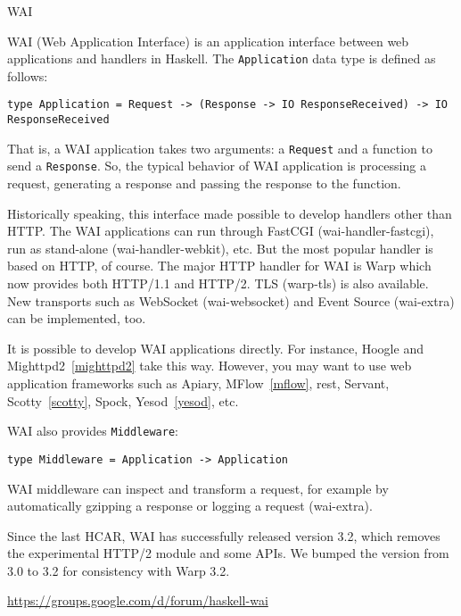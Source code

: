 \begin{hcarentry}{WAI}
\label{wai}
\makeheader

WAI (Web Application Interface) is an application interface
between web applications and handlers in Haskell.
The \texttt{Application} data type is defined as follows:

\begin{verbatim}
type Application = Request -> (Response -> IO ResponseReceived) -> IO ResponseReceived
\end{verbatim}

That is, a WAI application takes two arguments: a \texttt{Request} and
a function to send a \texttt{Response}.
So, the typical behavior of WAI application is
processing a request,
generating a response and
passing the response to the function.

Historically speaking, this interface made possible to develop handlers
other than HTTP.
The WAI applications can run through FastCGI (wai-handler-fastcgi),
run as stand-alone (wai-handler-webkit), etc.
But the most popular handler is based on HTTP, of course.
The major HTTP handler for WAI is Warp which now provides
both HTTP/1.1 and HTTP/2. TLS (warp-tls) is also available.
New transports such as
WebSocket (wai-websocket) and Event Source (wai-extra)
can be implemented, too.

It is possible to develop WAI applications directly.
For instance, Hoogle and Mighttpd2~\cref{mighttpd2} take this way.
However, you may want to use web application frameworks
such as Apiary, MFlow~\cref{mflow}, rest, Servant, Scotty~\cref{scotty}, Spock,
Yesod~\cref{yesod}, etc.

WAI also provides \texttt{Middleware}:

\begin{verbatim}
type Middleware = Application -> Application
\end{verbatim}

WAI middleware can inspect and transform a request, for example by automatically gzipping a response or logging a request (wai-extra).

Since the last HCAR, WAI has successfully released version 3.2,
which removes the experimental HTTP/2 module and some APIs.
We bumped the version from 3.0 to 3.2 for consistency with
Warp 3.2.

\FurtherReading
\begin{compactitem}
\item\url{https://groups.google.com/d/forum/haskell-wai}
\end{compactitem}
\end{hcarentry}
